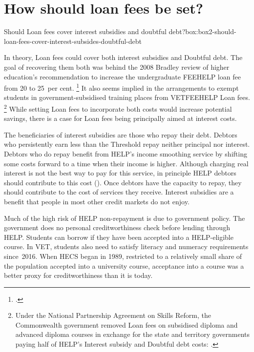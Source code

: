 \documentclass[embargoed]{grattan}
\begin{document}
\section{How should loan fees be set?}\label{how-should-loan-fees-be-set}


\begin{bigbox*}{Should \gls{Loan fees} cover interest subsidies and doubtful debt?}{box:box2-should-loan-fees-cover-interest-subsides-doubtful-debt}

In theory, \gls{Loan fees} could cover both interest subsidies and \gls{Doubtful debt}.
The goal of recovering them both was behind the 2008 Bradley review of higher education's recommendation to increase the undergraduate \gls{FEEHELP} loan fee from 20 to 25~per cent.%
\footcite[][167--168]{Bradley2008ReviewAustralianhigher}
It also seems implied in the arrangements to exempt students in government-subsidised training places from \gls{VETFEEHELP} \gls{Loan fees}.%
\footnote{Under the National Partnership Agreement on Skills Reform, the Commonwealth government removed \gls{Loan fees} on subsidised diploma and advanced diploma courses in exchange for the state and territory governments paying half of \gls{HELP}'s \gls{Interest subsidy} and \gls{Doubtful debt} costs: \textcite[][25]{AustralianGovernments2012NationalPartnershipAgreement}.} While setting \gls{Loan fees} to incorporate both costs would increase potential savings, there is a case for \gls{Loan fees} being principally aimed at interest costs.

The beneficiaries of interest subsidies are those who repay their debt.
Debtors who persistently earn less than the \gls{Threshold} repay neither principal nor interest.
Debtors who do repay benefit from \gls{HELP}'s income smoothing service by shifting some costs forward to a time when their income is higher.
Although charging real interest is not the best way to pay for this service, in principle \gls{HELP} debtors should contribute to this cost ().
Once debtors have the capacity to repay, they should contribute to the cost of services they receive.
Interest subsidies are a benefit that people in most other credit markets do not enjoy.

Much of the high risk of \gls{HELP} non-repayment is due to government policy.
The government does no personal creditworthiness check before lending through \gls{HELP}\@.
Students can borrow if they have been accepted into a \gls{HELP}-eligible course.
In VET, students also need to satisfy literacy and numeracy requirements since~2016.
When \gls{HECS} began in 1989, restricted to a relatively small share of the population accepted into a university course, acceptance into a course was a better proxy for creditworthiness than it is today.


\end{bigbox*}
\end{document}
